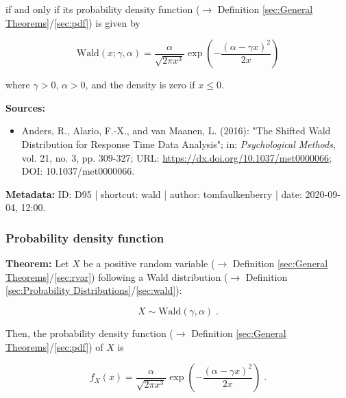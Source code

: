 \documentclass[a4paper,12pt,twoside]{book}
\begin{document}
if and only if its probability density function ($\rightarrow$ Definition \ref{sec:General Theorems}/\ref{sec:pdf}) is given by

\begin{equation} \label{eq:wald-wald-pdf}
\mathrm{Wald}(x; \gamma, \alpha) = \frac{\alpha}{\sqrt{2\pi x^3}}\exp\left(-\frac{(\alpha-\gamma x)^2}{2x}\right)
\end{equation}

where $\gamma > 0$, $\alpha > 0$, and the density is zero if $x \leq 0$.


\vspace{1em}
\textbf{Sources:}
\begin{itemize}
\item Anders, R., Alario, F.-X., and van Maanen, L. (2016): "The Shifted Wald Distribution for Response Time Data Analysis"; in: \textit{Psychological Methods}, vol. 21, no. 3, pp. 309-327; URL: \url{https://dx.doi.org/10.1037/met0000066}; DOI: 10.1037/met0000066.
\end{itemize}


\vspace{1em}
\textbf{Metadata:} ID: D95 | shortcut: wald | author: tomfaulkenberry | date: 2020-09-04, 12:00.
\vspace{1em}



\subsubsection[\textbf{Probability density function}]{Probability density function} \label{sec:wald-pdf}
\setcounter{equation}{0}

\textbf{Theorem:} Let $X$ be a positive random variable ($\rightarrow$ Definition \ref{sec:General Theorems}/\ref{sec:rvar}) following a Wald distribution ($\rightarrow$ Definition \ref{sec:Probability Distributions}/\ref{sec:wald}):

\begin{equation} \label{eq:wald-pdf-wald}
X \sim \mathrm{Wald}(\gamma, \alpha) \; .
\end{equation}

Then, the probability density function ($\rightarrow$ Definition \ref{sec:General Theorems}/\ref{sec:pdf}) of $X$ is

\begin{equation} \label{eq:wald-pdf-wald-pdf}
f_X(x) = \frac{\alpha}{\sqrt{2\pi x^3}}\exp\left(-\frac{(\alpha-\gamma x)^2}{2x}\right) \; .
\end{equation}
\end{document}
